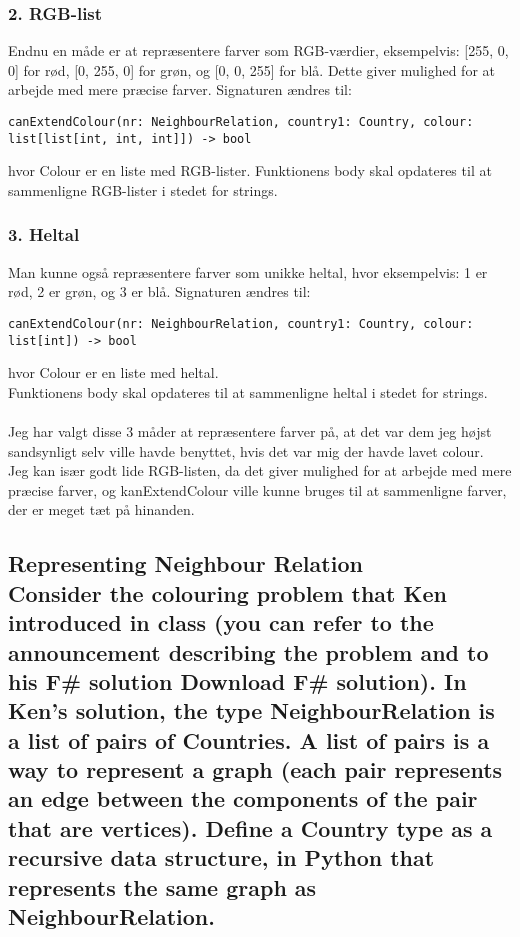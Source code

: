 \documentclass[a4paper,12pt]{article}
\begin{document}
\subsubsection*{2. RGB-list}
Endnu en måde er at repræsentere farver som RGB-værdier, eksempelvis: [255, 0, 0] for rød, [0, 255, 0] for grøn, og [0, 0, 255] for blå. Dette giver mulighed for at arbejde med mere præcise farver.
Signaturen ændres til:
\begin{lstlisting}
canExtendColour(nr: NeighbourRelation, country1: Country, colour: list[list[int, int, int]]) -> bool
\end{lstlisting}
hvor Colour er en liste med RGB-lister.
Funktionens body skal opdateres til at sammenligne RGB-lister i stedet for strings.

\subsubsection*{3. Heltal}
Man kunne også repræsentere farver som unikke heltal, hvor eksempelvis: 1 er rød, 2 er grøn, og 3 er blå.
Signaturen ændres til:
\begin{lstlisting}
canExtendColour(nr: NeighbourRelation, country1: Country, colour: list[int]) -> bool
\end{lstlisting}
hvor Colour er en liste med heltal.\\
Funktionens body skal opdateres til at sammenligne heltal i stedet for strings.\\
\\
Jeg har valgt disse 3 måder at repræsentere farver på, at det var dem jeg højst sandsynligt selv ville havde benyttet, hvis det var mig der havde lavet colour.\\
Jeg kan især godt lide RGB-listen, da det giver mulighed for at arbejde med mere præcise farver, og kanExtendColour ville kunne bruges til at sammenligne farver, der er meget tæt på hinanden.

\subsection[Representing Neighbour Relation]{Representing Neighbour Relation\\
Consider the colouring problem that Ken introduced in class (you can refer to the announcement describing the problem and to his F\# solution Download F\# solution).
In Ken's solution, the type NeighbourRelation is a list of pairs of Countries.
A list of pairs is a way to represent a graph (each pair represents an edge between the components of the pair that are vertices).
Define a Country type as a recursive data structure, in Python that represents the same graph as NeighbourRelation.}
\end{document}
